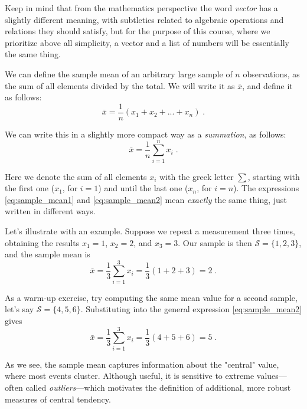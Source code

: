 Keep in mind that from the mathematics perspective the word \textit{vector} has a slightly different meaning, with subtleties related to algebraic operations and relations they should satisfy, but for the purpose of this course, where we prioritize above all simplicity, a vector and a list of numbers will be essentially the same thing.

\medskip

We can define the sample mean of an arbitrary large sample of $n$ observations, as the sum of all elements divided by the total. We will write it as $\bar{x}$, and define it as follows:
\begin{equation}
	\bar{x} = \frac{1}{n} (x_{1} + x_{2} + ... + x_{n}) \; .
	\label{eq:sample_mean1}
\end{equation}

We can write this in a slightly more compact way as a \textit{summation}, as follows:
\begin{equation}
	\bar{x} = \frac{1}{n} \sum_{i = 1}^{n} x_{i} \; .
	\label{eq:sample_mean2}
\end{equation}

Here we denote the sum of all elements $x_{i}$ with the greek letter $\sum$, starting with the first one ($x_1$, for $i = 1$) and until the last one ($x_n$, for $i = n$). The expressions \eqref{eq:sample_mean1} and \eqref{eq:sample_mean2} mean \textit{exactly} the same thing, just written in different ways.
\medskip

Let's illustrate with an example. Suppose we repeat a measurement three times, obtaining the results $x_1 = 1$, $x_2 = 2$, and $x_3 = 3$. Our sample is then $\mathcal{S} = \{1, 2, 3\}$, and the sample mean is
\begin{equation}
	\bar{x} = \frac{1}{3} \sum_{i = 1}^{3} x_{i} = \frac{1}{3} (1 + 2 + 3) = 2 \; . \nonumber
\end{equation}

As a warm-up exercise, try computing the same mean value for a second sample, let's say $\mathcal{S} = \{4, 5, 6\}$. Substituting into the general expression \eqref{eq:sample_mean2} gives
\begin{equation}
	\bar{x} = \frac{1}{3} \sum_{i = 1}^{3} x_{i} = \frac{1}{3} (4 + 5 + 6) = 5 \; . \nonumber
\end{equation}

As we see, the sample mean captures information about the "central" value, where most events cluster. Although useful, it is sensitive to extreme values—often called \textit{outliers}—which motivates the definition of additional, more robust measures of central tendency.

